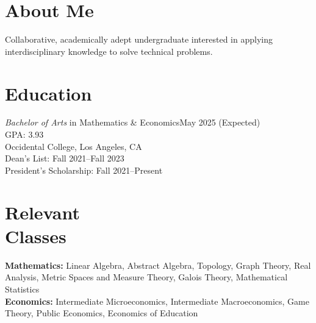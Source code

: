 \documentclass[margin, 12pt]{res} %
\begin{document}
\begin{resume}

\section{\sc About Me}
Collaborative, academically adept undergraduate interested in applying interdisciplinary knowledge to solve technical problems.

\section{\sc Education}

{\sl Bachelor of Arts} in Mathematics \& Economics\hfill May 2025 (Expected) \\
GPA: 3.93\\
Occidental College, Los Angeles, CA \\
Dean's List: Fall 2021--Fall 2023\\
President's Scholarship: Fall 2021--Present
\section{\sc Relevant \\ Classes}

\textbf{Mathematics:} Linear Algebra, Abstract Algebra, Topology, Graph Theory, Real Analysis, Metric Spaces and Measure Theory, Galois Theory, Mathematical Statistics\\
\textbf{Economics:} Intermediate Microeconomics, Intermediate Macroeconomics, Game Theory, Public Economics, Economics of Education

 

\end{resume}
\end{document}
